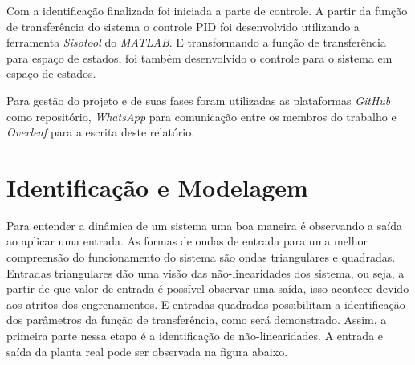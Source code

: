 \documentclass[a4paper,11pt]{article}
\begin{document}
Com a identificação finalizada foi iniciada a parte de controle. A partir da função de transferência do sistema o controle PID foi desenvolvido utilizando a ferramenta \textit{Sisotool} do \textit{MATLAB}. E transformando a função de transferência para espaço de estados, foi também desenvolvido o controle para o sistema em espaço de estados.

Para gestão do projeto e de suas fases foram utilizadas as plataformas \textit{GitHub} como repositório, \textit{WhatsApp} para comunicação entre os membros do trabalho e \textit{Overleaf} para a escrita deste relatório. 



\section{Identificação e Modelagem}


Para entender a dinâmica de um sistema uma boa maneira é observando a saída ao aplicar uma entrada. As formas de ondas de entrada para uma melhor compreensão do funcionamento do sistema são ondas triangulares e quadradas. Entradas triangulares dão uma visão das não-linearidades dos sistema, ou seja, a partir de que valor de entrada é possível observar uma saída, isso acontece devido aos atritos dos engrenamentos. E entradas quadradas possibilitam a identificação dos parâmetros da função de transferência, como será demonstrado. Assim, a primeira parte nessa etapa é a identificação de não-linearidades. A entrada e saída da planta real pode ser observada na figura abaixo.
\end{document}
